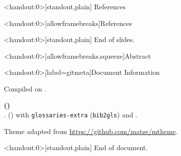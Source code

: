 \documentclass[compress, english]{beamer}%
\begin{document}
\begin{frame}<handout:0>[standout,plain]
References
\end{frame}
\begin{frame}<handout:0>[allowframebreaks]{References}%
\renewcommand*{\bibfont}{\tiny}%
\printbibliography
\end{frame}
\begin{frame}<handout:0>[standout,plain]
End of slides.
\end{frame}
\begin{frame}<handout:0>[allowframebreaks,squeeze]{Abstract}%
\tiny
\justifying

\end{frame}
\begin{frame}<handout:0>[label=gitmeta]{Document Information}
\DeclareUrlCommand{}%
{%
\color{gray}
\tiny
\textcolor{gray!80}{Compiled on \DTMnow{}.}

\scriptsize
{\ttfamily\bfseries\jobname{}
\expandafter\EscWrapper\expandafter{\GitVersion}
(\expandafter\EscWrapper\expandafter{\GitShorthash})}\\[\baselineskip]

\prettybanner{}.
\hologo{\fmtname} (\fmtversion) with \texttt{glossaries-extra} (\texttt{bib2gls}) and .

Theme adapted from \url{https://github.com/matze/mtheme}.
}%
\end{frame}
\begin{frame}<handout:0>[standout,plain]
End of document.
\end{frame}
\end{document}
